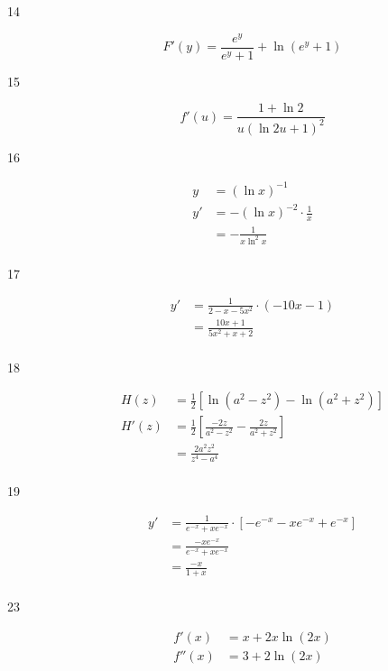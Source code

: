 \documentclass[letterpaper, landscape]{exam}
\begin{document}
\begin{description}
    \item[14] 
      \[
        F'(y) = \boxed{ \frac{e^y}{e^y + 1} + \ln \left( e^y + 1 \right) }
      \]

    \item[15] 
      \[
        f'(u) = \boxed{ \frac{1 + \ln 2}{u (\ln 2u + 1)^2} }
      \]

    \item[16] 
      \begin{align*}
        y  & = (\ln x)^{-1} \\
        y' & = - (\ln x)^{-2} \cdot \frac{1}{x} \\
           & = \boxed{ - \frac{1}{x \ln^2 x} } \\
      \end{align*}

    \item[17] 
      \begin{align*}
        y' & = \frac{1}{2 - x - 5x^2} \cdot (-10x - 1) \\
           & = \boxed{ \frac{10x + 1}{5x^2 + x + 2} } \\
      \end{align*}

    \item[18] 
      \begin{align*}
        H(z)  & = \frac{1}{2} \left[ \ln(a^2 - z^2) - \ln(a^2 + z^2)  \right] \\
        H'(z) & = \frac{1}{2} \left[ \frac{-2z}{a^2 - z^2} - \frac{2z}{a^2 + z^2} \right] \\
              & = \boxed{ \frac{2 a^2z^2}{z^4 - a^4} } \\
      \end{align*}

    \item[19] 
      \begin{align*}
        y' & = \frac{1}{e^{-x} + x e^{-x}} \cdot \left[ - e^{-x} - x e^{-x} + e^{-x} \right] \\
           & = \frac{- x e^{-x}}{e^{-x} + x e^{-x}} \\
           & = \boxed{ \frac{ - x}{1 + x} } \\
      \end{align*}

    \item[23] 
      \begin{align*}
        f'(x)  & = \boxed{ x + 2x \ln(2x) } \\
        f''(x) & = \boxed{ 3 + 2 \ln(2x) } \\
      \end{align*}


\end{description}
\end{document}
